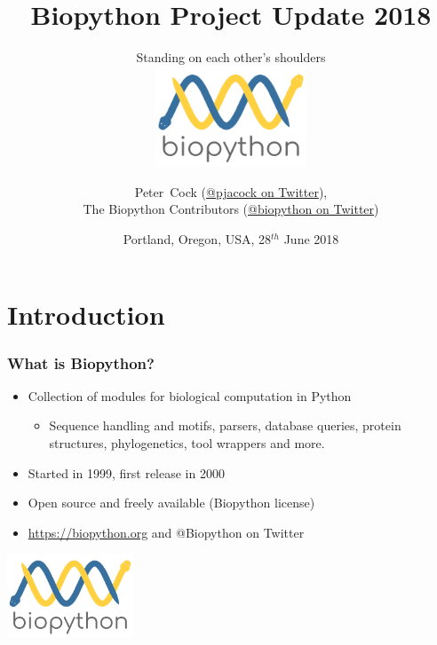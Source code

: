 

\usepackage{multicol}

\title[Biopython Project Update 2018] %
{Biopython Project Update 2018}
\subtitle{Standing on each other's shoulders \\ \includegraphics[height=3cm]{images/biopython_logo_m.png}}
\author[Cock] %
{Peter~Cock (\href{https://twitter.com/pjacock}{@pjacock on Twitter}), \\
The Biopython Contributors (\href{https://twitter.com/Biopython}{@biopython on Twitter})}
\date[June 2018] %
{Portland, Oregon, USA, 28$^{th}$ June 2018}
\subject{Bioinformatics}





\frame[plain]{\titlepage}

\section{Introduction}

\begin{frame}
  \frametitle{What is Biopython?}

  \begin{itemize}
  \item Collection of modules for biological computation in Python
  \begin{itemize}
  \item Sequence handling and motifs, parsers, database queries, protein structures, phylogenetics, tool wrappers and more.
  \end{itemize}
  \item Started in 1999, first release in 2000
  \item Open source and freely available (Biopython license)
  \item \url{https://biopython.org} and @Biopython on Twitter
  \end{itemize}

\center
\includegraphics[height=2.5cm]{images/biopython_logo_m.png}

\end{frame}

